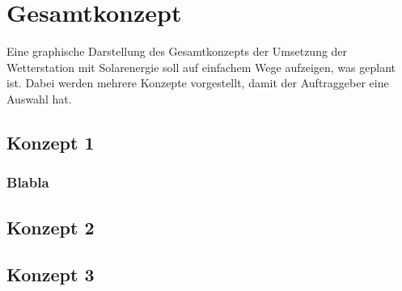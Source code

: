 \section{Gesamtkonzept}
Eine graphische Darstellung des Gesamtkonzepts der Umsetzung der Wetterstation mit Solarenergie soll auf einfachem Wege aufzeigen, was geplant ist. Dabei werden mehrere Konzepte vorgestellt, damit der Auftraggeber eine Auswahl hat.\\
\subsection{Konzept 1}
\subsubsection{Blabla}
\subsection{Konzept 2}
\subsection{Konzept 3}